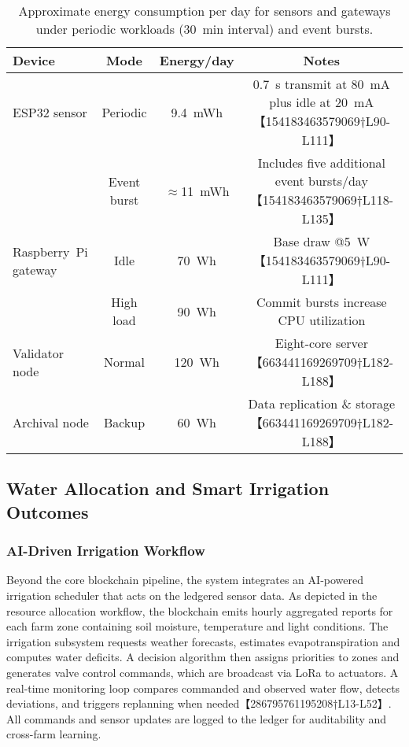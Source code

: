 \begin{table}[!t]
  \centering
  \caption{Approximate energy consumption per day for sensors and gateways under periodic workloads (30~min interval) and event bursts.}
  \label{tab:energy}
  \begin{tabular}{lccc}
    \toprule
    Device & Mode & Energy/day & Notes \\
    \midrule
    ESP32 sensor & Periodic & 9.4~mWh & 0.7~s transmit at 80~mA plus idle at 20~mA【154183463579069†L90-L111】 \\
                 & Event burst & $\approx$11~mWh & Includes five additional event bursts/day【154183463579069†L118-L135】 \\
    Raspberry~Pi gateway & Idle & 70~Wh & Base draw @5~W【154183463579069†L90-L111】 \\
                      & High load & 90~Wh & Commit bursts increase CPU utilization \\
    Validator node & Normal & 120~Wh & Eight-core server【663441169269709†L182-L188】 \\
    Archival node & Backup & 60~Wh & Data replication \& storage【663441169269709†L182-L188】 \\
    \bottomrule
  \end{tabular}
\end{table}

\subsection{Water Allocation and Smart Irrigation Outcomes}
\subsubsection{AI-Driven Irrigation Workflow}
Beyond the core blockchain pipeline, the system integrates an AI‑powered irrigation scheduler that acts on the ledgered sensor data.  As depicted in the resource allocation workflow, the blockchain emits hourly aggregated reports for each farm zone containing soil moisture, temperature and light conditions.  The irrigation subsystem requests weather forecasts, estimates evapotranspiration and computes water deficits.  A decision algorithm then assigns priorities to zones and generates valve control commands, which are broadcast via LoRa to actuators.  A real‑time monitoring loop compares commanded and observed water flow, detects deviations, and triggers replanning when needed【286795761195208†L13-L52】.  All commands and sensor updates are logged to the ledger for auditability and cross-farm learning.

